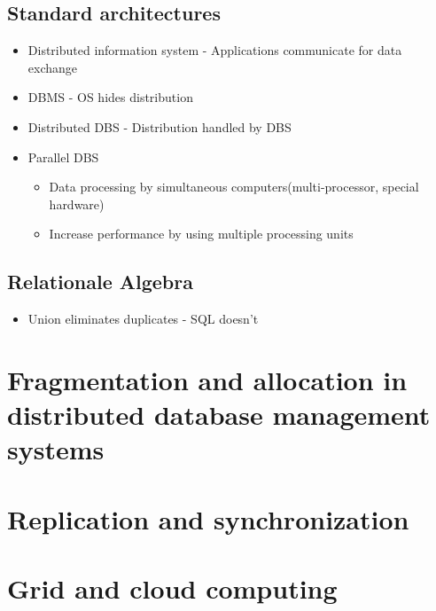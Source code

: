 \documentclass[10pt,a4paper]{article}
\begin{document}
\subsection{Standard architectures}
	\begin{itemize}
		\item Distributed information system - Applications communicate for data exchange
		\item DBMS - OS hides distribution
		\item Distributed DBS - Distribution handled by DBS
		\item Parallel DBS
		\begin{itemize}
			\item Data processing by simultaneous computers(multi-processor, special hardware)
			\item Increase performance by using multiple processing units
		\end{itemize}

	\end{itemize}

\subsection{Relationale Algebra}
	\begin{itemize}
		\item Union eliminates duplicates - SQL doesn't
	\end{itemize}

\section{Fragmentation and allocation in distributed database management systems}

\section{Replication and synchronization}

\section{Grid and cloud computing}
\end{document}
